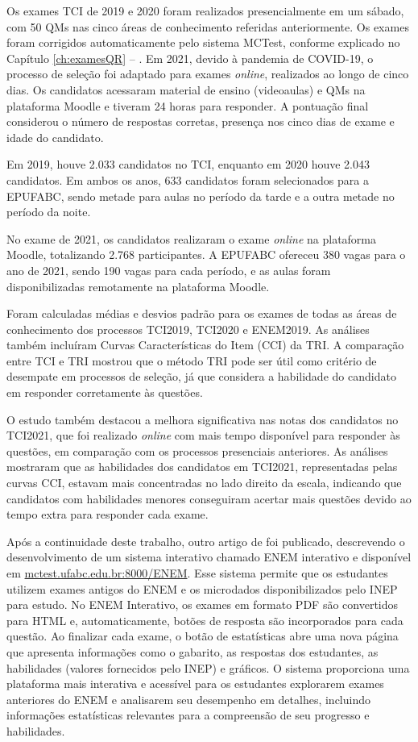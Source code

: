 Os exames TCI de 2019 e 2020 foram realizados presencialmente em um sábado, com 50 QMs nas cinco áreas de conhecimento referidas anteriormente. Os exames foram corrigidos automaticamente pelo sistema MCTest, conforme explicado no Capítulo \ref{ch:examesQR} -- . Em 2021, devido à pandemia de COVID-19, o processo de seleção foi adaptado para exames \textit{online}, realizados ao longo de cinco dias. Os candidatos acessaram material de ensino (videoaulas) e QMs na plataforma Moodle e tiveram 24 horas para responder. A pontuação final considerou o número de respostas corretas, presença nos cinco dias de exame e idade do candidato.

Em 2019, houve 2.033 candidatos no TCI, enquanto em 2020 houve 2.043 candidatos. Em ambos os anos, 633 candidatos foram selecionados para a EPUFABC, sendo metade para aulas no período da tarde e a outra metade no período da noite. 

No exame de 2021, os candidatos realizaram o exame \textit{online} na plataforma Moodle, totalizando 2.768 participantes. A EPUFABC ofereceu 380 vagas para o ano de 2021, sendo 190 vagas para cada período, e as aulas foram disponibilizadas remotamente na plataforma Moodle.

Foram calculadas médias e desvios padrão para os exames de todas as áreas de conhecimento dos processos TCI2019, TCI2020 e ENEM2019. As análises também incluíram Curvas Características do Item (CCI) da TRI. A comparação entre TCI e TRI mostrou que o método TRI pode ser útil como critério de desempate em processos de seleção, já que considera a habilidade do candidato em responder corretamente às questões.

O estudo também destacou a melhora significativa nas notas dos candidatos no TCI2021, que foi realizado \textit{online} com mais tempo disponível para responder às questões, em comparação com os processos presenciais anteriores. As análises mostraram que as habilidades dos candidatos em TCI2021, representadas pelas curvas CCI, estavam mais concentradas no lado direito da escala, indicando que candidatos com habilidades menores conseguiram acertar mais questões devido ao tempo extra para responder cada exame.


Após a continuidade deste trabalho, outro artigo de  foi publicado, descrevendo o desenvolvimento de um sistema interativo chamado ENEM interativo e disponível em \href{http://mctest.ufabc.edu.br:8000/ENEM}{mctest.ufabc.edu.br:8000/ENEM}. Esse sistema permite que os estudantes utilizem exames antigos do ENEM e os microdados disponibilizados pelo INEP para estudo.
%
No ENEM Interativo, os exames em formato PDF são convertidos para HTML e, automaticamente, botões de resposta são incorporados para cada questão. Ao finalizar cada exame, o botão de estatísticas abre uma nova página que apresenta informações como o gabarito, as respostas dos estudantes, as habilidades (valores fornecidos pelo INEP) e gráficos.
%
O sistema proporciona uma plataforma mais interativa e acessível para os estudantes explorarem exames anteriores do ENEM e analisarem seu desempenho em detalhes, incluindo informações estatísticas relevantes para a compreensão de seu progresso e habilidades.


